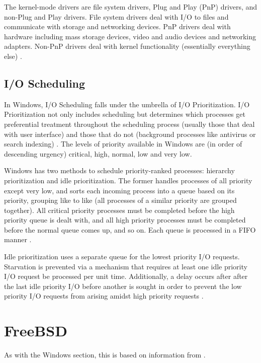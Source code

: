 \documentclass[10pt,draftclsnofoot,onecolumn,compsoc]{IEEEtran}
\begin{document}
	The kernel-mode drivers are file system drivers, Plug and Play (PnP) drivers, and non-Plug and Play drivers. File system drivers deal with I/O to files and communicate with storage and networking devices. PnP drivers deal with hardware including mass storage devices, video and audio devices and networking adapters. Non-PnP drivers deal with kernel functionality (essentially everything else) \cite{WInternals}.
	
	\subsection{I/O Scheduling}
	
	In Windows, I/O Scheduling falls under the umbrella of I/O Prioritization. I/O Prioritization not only includes scheduling but determines which processes get preferential treatment throughout the scheduling process (usually those that deal with user interface) and those that do not (background processes like antivirus or search indexing) \cite{WInternals}. The levels of priority available in Windows are (in order of descending urgency) critical, high, normal, low and very low.
	
	Windows has two methods to schedule priority-ranked processes: hierarchy prioritization and idle prioritization. The former handles processes of all priority except very low, and sorts each incoming process into a queue based on its priority, grouping like to like (all processes of a similar priority are grouped together). All critical priority processes must be completed before the high priority queue is dealt with, and all high priority processes must be completed before the normal queue comes up, and so on. Each queue is processed in a FIFO manner \cite{WInternals}.
	
	Idle prioritization uses a separate queue for the lowest priority I/O requests. Starvation is prevented via a mechanism that requires at least one idle priority I/O request be processed per unit time. Additionally, a delay occurs after after the last idle priority I/O before another is sought in order to prevent the low priority I/O requests from arising amidst high priority requests \cite{WInternals}.
	
	\section{FreeBSD}
	
	As with the Windows section, this is based on information from \cite{BSD}.
	
\end{document}
